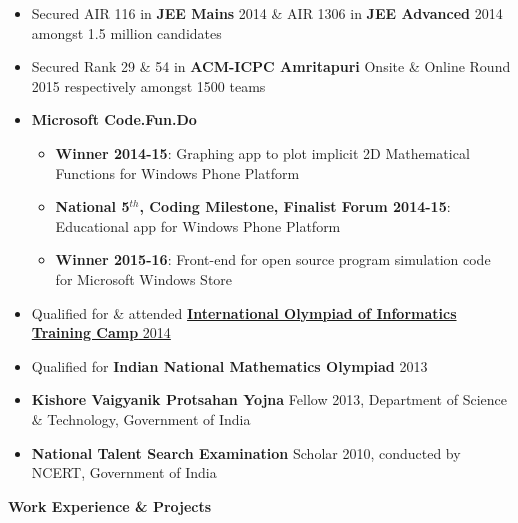 \documentclass[letterpaper,11pt]{article}
\begin{document}
{\begin{itemize}
    \item Secured AIR 116 in \textbf{JEE Mains} 2014 \& AIR 1306 in \textbf{JEE Advanced} 2014 amongst 1.5 million candidates
        \vspace{-5pt}
    \item Secured Rank 29 \& 54 in \textbf{ACM-ICPC Amritapuri} Onsite \& Online Round 2015 respectively amongst 1500 teams
        \vspace{-5pt}
    \item \textbf{Microsoft Code.Fun.Do}
        \vspace{-5pt}
        \begin{itemize}
            \item \textbf{Winner 2014-15}: Graphing app to plot implicit 2D Mathematical Functions for Windows Phone Platform
                \vspace{-2pt}
            \item \textbf{National 5$^{th}$, Coding Milestone, Finalist Forum 2014-15}: Educational app for Windows Phone Platform
                \vspace{-2pt}
            \item \textbf{Winner 2015-16}: Front-end for open source program simulation code for Microsoft Windows Store
                \vspace{-2pt}
        \end{itemize}
        \vspace{-5pt}
    \item Qualified for \& attended \href{http://www.iarcs.org.in/inoi/2014/inoi2014/results_inoi2014.php}{\textbf{International Olympiad of Informatics Training Camp} 2014}
        \vspace{-5pt}
    \item Qualified for \textbf{Indian National Mathematics Olympiad} 2013
        \vspace{-5pt}
    \item \textbf{Kishore Vaigyanik Protsahan Yojna} Fellow 2013, Department of Science \& Technology, Government of India
        \vspace{-5pt}
    \item \textbf{National Talent Search Examination} Scholar 2010, conducted by NCERT, Government of India
\end{itemize}

\vspace{-1pt}
\Large{\textbf{Work Experience \& Projects}}
\small
\vspace{-5pt}

}
\end{document}
